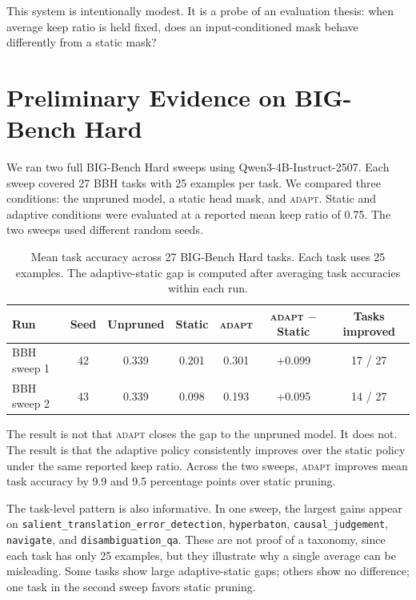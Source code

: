 \documentclass{article}
\newcommand{\method}{\textsc{adapt}}
\begin{document}
This system is intentionally modest. It is a probe of an evaluation thesis:
when average keep ratio is held fixed, does an input-conditioned mask behave
differently from a static mask?

\section{Preliminary Evidence on BIG-Bench Hard}

We ran two full BIG-Bench Hard sweeps \citep{suzgun2022challenging} using
Qwen3-4B-Instruct-2507. Each sweep covered 27 BBH tasks with 25 examples per
task. We compared three conditions: the unpruned model, a static head mask, and
\method{}. Static and adaptive conditions were evaluated at a reported mean keep
ratio of 0.75. The two sweeps used different random seeds.

\begin{table}[t]
  \centering
  \caption{Mean task accuracy across 27 BIG-Bench Hard tasks. Each task uses
  25 examples. The adaptive-static gap is computed after averaging task
  accuracies within each run.}
  \label{tab:bbh}
  \begin{tabular}{lcccccc}
    \toprule
    Run & Seed & Unpruned & Static & \method{} & \method{} $-$ Static &
    Tasks improved \\
    \midrule
    BBH sweep 1 & 42 & 0.339 & 0.201 & 0.301 & +0.099 & 17 / 27 \\
    BBH sweep 2 & 43 & 0.339 & 0.098 & 0.193 & +0.095 & 14 / 27 \\
    \bottomrule
  \end{tabular}
\end{table}

The result is not that \method{} closes the gap to the unpruned model. It does
not. The result is that the adaptive policy consistently improves over the
static policy under the same reported keep ratio. Across the two sweeps,
\method{} improves mean task accuracy by 9.9 and 9.5 percentage points over
static pruning.

The task-level pattern is also informative. In one sweep, the largest gains
appear on \texttt{salient\_translation\_error\_detection},
\texttt{hyperbaton}, \texttt{causal\_judgement}, \texttt{navigate}, and
\texttt{disambiguation\_qa}. These are not proof of a taxonomy, since each
task has only 25 examples, but they illustrate why a single average can be
misleading. Some tasks show large adaptive-static gaps; others show no
difference; one task in the second sweep favors static pruning.
\end{document}
